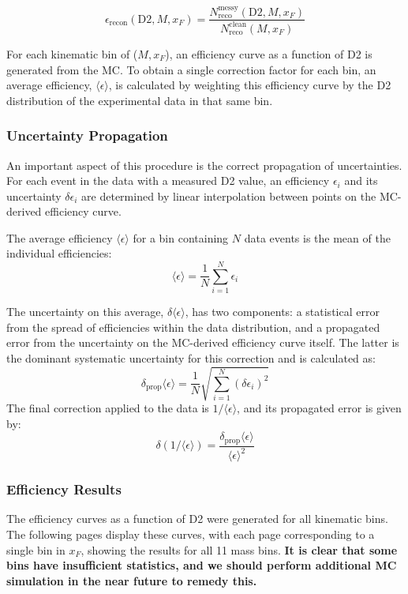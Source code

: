 \documentclass[11pt]{article}
\begin{document}
\begin{equation}
    \epsilon_{\text{recon}}(\text{D2}, M, x_F) = \frac{N_{\text{reco}}^{\text{messy}}(\text{D2}, M, x_F)}{N_{\text{reco}}^{\text{clean}}(M, x_F)}
\end{equation}

For each kinematic bin of ($M, x_F$), an efficiency curve as a function of D2 is generated from the MC. To obtain a single correction factor for each bin, an average efficiency, $\langle \epsilon \rangle$, is calculated by weighting this efficiency curve by the D2 distribution of the experimental data in that same bin.

\subsubsection{Uncertainty Propagation}
An important aspect of this procedure is the correct propagation of uncertainties. For each event in the data with a measured D2 value, an efficiency $\epsilon_{i}$ and its uncertainty $\delta\epsilon_{i}$ are determined by linear interpolation between points on the MC-derived efficiency curve.

The average efficiency $\langle\epsilon\rangle$ for a bin containing $N$ data events is the mean of the individual efficiencies:
\begin{equation} \label{eq:avg_eff_2}
    \langle\epsilon\rangle = \frac{1}{N} \sum_{i=1}^{N} \epsilon_i
\end{equation}

The uncertainty on this average, $\delta\langle\epsilon\rangle$, has two components: a statistical error from the spread of efficiencies within the data distribution, and a propagated error from the uncertainty on the MC-derived efficiency curve itself. The latter is the dominant systematic uncertainty for this correction and is calculated as:
\begin{equation} \label{eq:prop_err_2}
    \delta_{\text{prop}} \langle\epsilon\rangle = \frac{1}{N} \sqrt{\sum_{i=1}^{N} (\delta\epsilon_i)^2}
\end{equation}
The final correction applied to the data is $1/\langle\epsilon\rangle$, and its propagated error is given by:
\begin{equation} \label{eq:inv_err_2}
    \delta(1/\langle\epsilon\rangle) = \frac{\delta_{\text{prop}}\langle\epsilon\rangle}{\langle\epsilon\rangle^2}
\end{equation}

\subsubsection{Efficiency Results}
The efficiency curves as a function of D2 were generated for all kinematic bins. The following pages display these curves, with each page corresponding to a single bin in $x_F$, showing the results for all 11 mass bins.  {\bf It is clear that some bins have insufficient statistics, and we should perform additional MC simulation in the near future to remedy this.}
\end{document}
